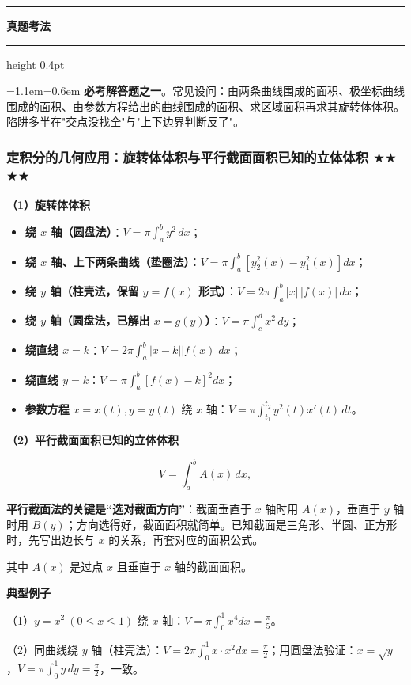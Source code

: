 \documentclass[11pt,openany,UTF8]{ctexbook}
\newcommand{\callouthead}[2]{%
  \par\addvspace{7pt}\noindent
  {\color{#1}\rule[-0.15em]{3pt}{1.05em}}\hspace{0.5em}%
  {\bfseries\color{#1}#2}\par\nobreak\vspace{-0.35em}%
  {\color{rulesep}\hrule height 0.4pt}\nobreak\vspace{0.45em}%
  \begingroup\small\setlength{\parindent}{0pt}%
  \leftskip=1.1em\rightskip=0.6em\noindent\ignorespaces}
\newcommand{\calloutend}{\par\endgroup\addvspace{7pt}}
\newenvironment{callexam}[1]{\callouthead{exambar}{#1}}{\calloutend}
\begin{document}
\begin{callexam}{真题考法}
\textbf{必考解答题之一}。常见设问：由两条曲线围成的面积、极坐标曲线围成的面积、由参数方程给出的曲线围成的面积、求区域面积再求其旋转体体积。陷阱多半在"交点没找全"与"上下边界判断反了"。

\end{callexam}

\subsubsection{定积分的几何应用：旋转体体积与平行截面面积已知的立体体积 $\bigstar$$\bigstar$$\bigstar$$\bigstar$}

\textbf{（1）旋转体体积}

\begin{itemize}
\item \textbf{绕 $x$ 轴（圆盘法）}：$V=\displaystyle\pi\int_a^by^2\,dx$；
\item \textbf{绕 $x$ 轴、上下两条曲线（垫圈法）}：$V=\displaystyle\pi\int_a^b\left[y_2^2(x)-y_1^2(x)\right]dx$；
\item \textbf{绕 $y$ 轴（柱壳法，保留 $y=f(x)$ 形式）}：$V=\displaystyle2\pi\int_a^b\lvert x\rvert\,\lvert f(x)\rvert\,dx$；
\item \textbf{绕 $y$ 轴（圆盘法，已解出 $x=g(y)$）}：$V=\displaystyle\pi\int_c^dx^2\,dy$；
\item \textbf{绕直线 $x=k$}：$V=\displaystyle2\pi\int_a^b\lvert x-k\rvert\lvert f(x)\rvert dx$；
\item \textbf{绕直线 $y=k$}：$V=\displaystyle\pi\int_a^b\left[f(x)-k\right]^2dx$；
\item \textbf{参数方程} $x=x(t),y=y(t)$ 绕 $x$ 轴：$V=\displaystyle\pi\int_{t_1}^{t_2}y^2(t)x'(t)\,dt$。
\end{itemize}
\textbf{（2）平行截面面积已知的立体体积}

\[V=\int_a^bA(x)\,dx,\]

\textbf{平行截面法的关键是“选对截面方向”}：截面垂直于 $x$ 轴时用 $A(x)$，垂直于 $y$ 轴时用 $B(y)$；方向选得好，截面面积就简单。已知截面是三角形、半圆、正方形时，先写出边长与 $x$ 的关系，再套对应的面积公式。

其中 $A(x)$ 是过点 $x$ 且垂直于 $x$ 轴的截面面积。

\textbf{典型例子}

（1）$y=x^2\ (0\leq x\leq1)$ 绕 $x$ 轴：$V=\pi\int_0^1x^4dx=\frac{\pi}{5}$。

（2）同曲线绕 $y$ 轴（柱壳法）：$V=2\pi\int_0^1x\cdot x^2dx=\frac{\pi}{2}$；用圆盘法验证：$x=\sqrt{y}$，$V=\pi\int_0^1y\,dy=\frac{\pi}{2}$，一致。
\end{document}

